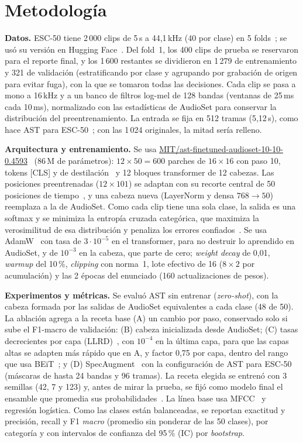 \documentclass[letterpaper, 10 pt, conference]{ieeeconf}
\begin{document}
\section{Metodología}
\textbf{Datos.} ESC-50 tiene 2\,000 clips de 5\,s a 44,1\,kHz (40 por clase) en 5 folds~\cite{piczak}; se usó su versión en Hugging Face~\cite{hfdata}. Del fold~1, los 400 clips de prueba se reservaron para el reporte final, y los 1\,600 restantes se dividieron en 1\,279 de entrenamiento y 321 de validación (estratificando por clase y agrupando por grabación de origen para evitar fuga), con la que se tomaron todas las decisiones. Cada clip se pasa a mono a 16\,kHz y a un banco de filtros log-mel de 128 bandas (ventanas de 25\,ms cada 10\,ms), normalizado con las estadísticas de AudioSet para conservar la distribución del preentrenamiento. La entrada se fija en 512 tramas (5,12\,s), como hace AST para ESC-50~\cite{ast}; con las 1\,024 originales, la mitad sería relleno.

\textbf{Arquitectura y entrenamiento.} Se usa \url{MIT/ast-finetuned-audioset-10-10-0.4593}~\cite{ast} (86\,M de parámetros): $12\times50=600$ parches de $16\times16$ con paso 10, tokens [CLS] y de destilación~\cite{deit} y 12 bloques transformer de 12 cabezas. Las posiciones preentrenadas ($12\times101$) se adaptan con su recorte central de 50 posiciones de tiempo~\cite{ast}, y una cabeza nueva (LayerNorm y densa $768\rightarrow50$) reemplaza a la de AudioSet. Como cada clip tiene una sola clase, la salida es una softmax y se minimiza la entropía cruzada categórica, que maximiza la verosimilitud de esa distribución y penaliza los errores confiados~\cite{goodfellow}. Se usa AdamW~\cite{adamw} con tasa de $3\cdot10^{-5}$ en el transformer, para no destruir lo aprendido en AudioSet, y de $10^{-3}$ en la cabeza, que parte de cero; \textit{weight decay} de 0,01, \textit{warmup} del 10\,\%, \textit{clipping} con norma~1, lote efectivo de 16 ($8\times2$ por acumulación) y las 2 épocas del enunciado (160 actualizaciones de pesos).

\textbf{Experimentos y métricas.} Se evaluó AST sin entrenar (\textit{zero-shot}), con la cabeza formada por las salidas de AudioSet equivalentes a cada clase (48 de 50). La ablación agrega a la receta base (A) un cambio por paso, conservado solo si sube el F1-macro de validación: (B) cabeza inicializada desde AudioSet; (C) tasas decrecientes por capa (LLRD)~\cite{ulmfit}, con $10^{-4}$ en la última capa, para que las capas altas se adapten más rápido que en A, y factor 0,75 por capa, dentro del rango que usa BEiT~\cite{beit}; y (D) SpecAugment~\cite{specaugment} con la configuración de AST para ESC-50 (máscaras de hasta 24 bandas y 96 tramas). La receta elegida se entrenó con 3 semillas (42, 7 y 123) y, antes de mirar la prueba, se fijó como modelo final el ensamble que promedia sus probabilidades~\cite{ensembles}. La línea base usa MFCC~\cite{mfcc} y regresión logística. Como las clases están balanceadas, se reportan exactitud y precisión, recall y F1 \textit{macro} (promedio sin ponderar de las 50 clases), por categoría y con intervalos de confianza del 95\,\% (IC) por \textit{bootstrap}.
\end{document}
